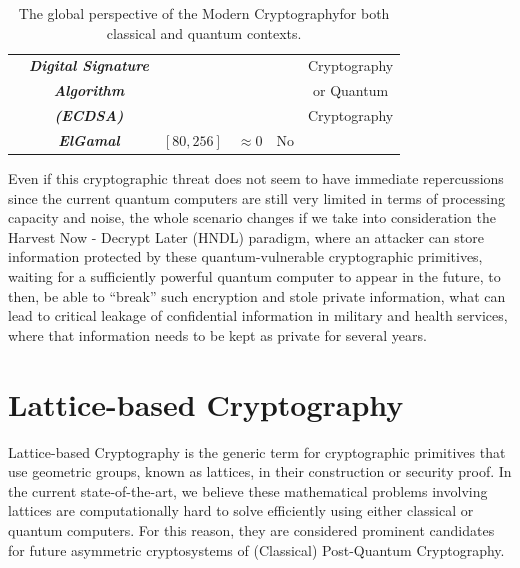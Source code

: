 \documentclass[runningheads]{llncs}
\numberwithin{equation}{section}
\begin{document}
\begin{table}[ht!]
{\begin{tabular}{|c|c|cc|c|c|}
        & \textbf{\textit{Digital Signature}}        & \multicolumn{1}{c|}{}                     &                      &                                  & Cryptography    \\
        & \textbf{\textit{Algorithm}}                & \multicolumn{1}{c|}{}                     &                      &                                  & or Quantum      \\
        & \textbf{\textit{(ECDSA)}}                  & \multicolumn{1}{c|}{}                     &                      &                                  & Cryptography    \\ \cline{2-5}
        & \textbf{\textit{ElGamal}}                  & \multicolumn{1}{c|}{$[80,256]$}                     & $\approx 0$                     & No                               &                 \\ \hline
        \end{tabular}}
        \caption{\centering The global perspective of the Modern Cryptography\break for both classical and quantum contexts.}
        \label{tab:global-perspective-modern-cryptography-classical-quantum-contexts}
    \end{table}

    \newpage
    
    \noindent Even if this cryptographic threat does not seem to have immediate repercussions since the current quantum computers are still very limited in terms of processing capacity and noise, the whole scenario changes if we take into consideration the Harvest Now - Decrypt Later (HNDL) paradigm, where an attacker can store information protected by these quantum-vulnerable cryptographic primitives, waiting for a sufficiently powerful quantum computer to appear in the future, to then, be able to ``break'' such encryption and stole private information, what can lead to critical leakage of confidential information in military and health services, where that information needs to be kept as private for several years.

    
    \section{Lattice-based Cryptography}
    \label{sec:lattice-based-cryptography}

    Lattice-based Cryptography is the generic term for cryptographic primitives that use geometric groups, known as lattices, in their construction or security proof. In the current state-of-the-art, we believe these mathematical problems involving lattices are computationally hard to solve efficiently using either classical or quantum computers. For this reason, they are considered prominent candidates for future asymmetric cryptosystems of (Classical) Post-Quantum Cryptography.
\end{document}
